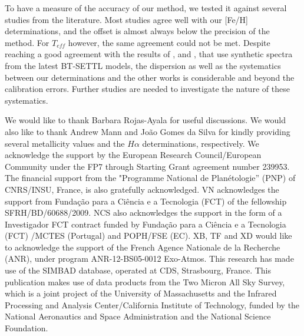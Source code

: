\documentclass[referee]{aa}
\begin{document}
To have a measure of the accuracy of our method, we tested it against several studies from the literature. Most studies agree well with our [Fe/H] determinations, and the offset is almost always below the precision of the method. For $T_{eff}$ however, the same agreement could not be met. Despite reaching a good agreement with the results of \citet{Woolf-2005}, and \citet{Rajpurohit-2013a}, that use synthetic spectra from the latest BT-SETTL models, the dispersion as well as the systematics between our determinations and the other works is considerable and beyond the calibration errors. Further studies are needed to investigate the nature of these systematics. 










\begin{acknowledgements}
We would like to thank Barbara Rojas-Ayala for useful discussions. We would also like to thank Andrew Mann and Jo\~ao Gomes da Silva for kindly providing several metallicity values and the $H\alpha$ determinations, respectively. We acknowledge the support by the European Research Council/European Community under the FP7 through Starting Grant agreement number 239953. The financial support from the "Programme National de Plan\'etologie'' (PNP) of CNRS/INSU, France, is also gratefully acknowledged. VN acknowledges the support from Funda\c{c}\~ao para a Ci\^encia e a Tecnologia (FCT) of the fellowship SFRH/BD/60688/2009. NCS also acknowledges the support in the form of a Investigador FCT contract funded by Funda\c{c}\~ao para a Ci\^encia e a Tecnologia (FCT) /MCTES (Portugal) and POPH/FSE (EC). XB, TF and XD would like to acknowledge the support of the French Agence Nationale de la Recherche (ANR), under program ANR-12-BS05-0012 Exo-Atmos. This research has made use of the SIMBAD database, operated at CDS, Strasbourg, France. This publication makes use of data products from the Two Micron All Sky Survey, which is a joint project of the University of Massachusetts and the Infrared Processing and Analysis Center/California Institute of Technology, funded by the National Aeronautics and Space Administration and the National Science Foundation.

\end{acknowledgements}
\end{document}
